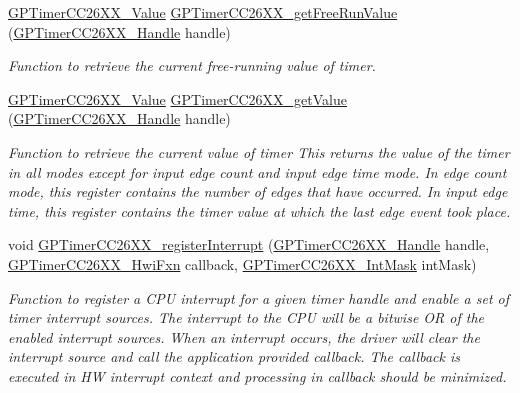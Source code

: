 \begin{DoxyCompactItemize}
\hyperlink{_g_p_timer_c_c26_x_x_8h_ab667a2fd47273a9778f5011774fa55c0}{G\+P\+Timer\+C\+C26\+X\+X\+\_\+\+Value} \hyperlink{_g_p_timer_c_c26_x_x_8h_af4832251ebc2e81a952bbc1c39d2502e}{G\+P\+Timer\+C\+C26\+X\+X\+\_\+get\+Free\+Run\+Value} (\hyperlink{_g_p_timer_c_c26_x_x_8h_ab85403dde5940c587c57ca1a140e655a}{G\+P\+Timer\+C\+C26\+X\+X\+\_\+\+Handle} handle)
\begin{DoxyCompactList}\small\item\em Function to retrieve the current free-\/running value of timer. \end{DoxyCompactList}\item 
\hyperlink{_g_p_timer_c_c26_x_x_8h_ab667a2fd47273a9778f5011774fa55c0}{G\+P\+Timer\+C\+C26\+X\+X\+\_\+\+Value} \hyperlink{_g_p_timer_c_c26_x_x_8h_a553ef86139c25234964c81783aa2cd94}{G\+P\+Timer\+C\+C26\+X\+X\+\_\+get\+Value} (\hyperlink{_g_p_timer_c_c26_x_x_8h_ab85403dde5940c587c57ca1a140e655a}{G\+P\+Timer\+C\+C26\+X\+X\+\_\+\+Handle} handle)
\begin{DoxyCompactList}\small\item\em Function to retrieve the current value of timer This returns the value of the timer in all modes except for input edge count and input edge time mode. In edge count mode, this register contains the number of edges that have occurred. In input edge time, this register contains the timer value at which the last edge event took place. \end{DoxyCompactList}\item 
void \hyperlink{_g_p_timer_c_c26_x_x_8h_a4032d544f2b79ae1a999a4faa5ee0884}{G\+P\+Timer\+C\+C26\+X\+X\+\_\+register\+Interrupt} (\hyperlink{_g_p_timer_c_c26_x_x_8h_ab85403dde5940c587c57ca1a140e655a}{G\+P\+Timer\+C\+C26\+X\+X\+\_\+\+Handle} handle, \hyperlink{_g_p_timer_c_c26_x_x_8h_a6b9b95974e20f85ccd3f8463fdda84f1}{G\+P\+Timer\+C\+C26\+X\+X\+\_\+\+Hwi\+Fxn} callback, \hyperlink{_g_p_timer_c_c26_x_x_8h_ac74410bfd92bf89732dd795bbe8769d1}{G\+P\+Timer\+C\+C26\+X\+X\+\_\+\+Int\+Mask} int\+Mask)
\begin{DoxyCompactList}\small\item\em Function to register a C\+P\+U interrupt for a given timer handle and enable a set of timer interrupt sources. The interrupt to the C\+P\+U will be a bitwise O\+R of the enabled interrupt sources. When an interrupt occurs, the driver will clear the interrupt source and call the application provided callback. The callback is executed in H\+W interrupt context and processing in callback should be minimized. \end{DoxyCompactList}\item 

\end{DoxyCompactItemize}
